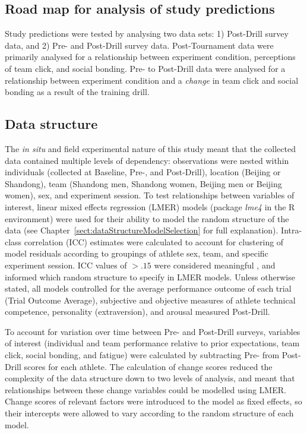 \begin{CJK}{UTF8}{gbsn}
\subsection{Road map for analysis of study predictions}

Study predictions were tested by analysing two data sets: 1) Post-Drill survey data, and 2) Pre- and Post-Drill survey data.  Post-Tournament data were primarily analysed for a relationship between experiment condition, perceptions of team click, and social bonding.  Pre- to Post-Drill data were analysed for a relationship between experiment condition and a \textit{change} in team click and social bonding as a result of the training drill.





\subsection{Data structure}
The \textit{in situ} and field experimental nature of this study meant that the collected data contained multiple levels of dependency: observations were nested within individuals (collected at Baseline, Pre-, and Post-Drill), location (Beijing or Shandong), team (Shandong men, Shandong women, Beijing men or Beijing women), sex, and experiment session.   To test relationships between variables of interest, linear mixed effects regression (LMER) models (package \textit{lme4} in the R environment) were used for their ability to model the random structure of the data (see Chapter~\ref{sect:dataStructureModelSelection} for full explanation).  Intra-class correlation (ICC) estimates were calculated to account for clustering of model residuals according to groupings of athlete sex, team, and specific experiment session.  ICC values of $>.15$ were considered meaningful \citep{Field2012}, and informed which random structure to specify in LMER models.  Unless otherwise stated, all models controlled for the average performance outcome of each trial (Trial Outcome Average), subjective and objective measures of athlete technical competence, personality (extraversion), and arousal measured Post-Drill.

To account for variation over time between Pre- and Post-Drill surveys, variables of interest (individual and team performance relative to prior expectations, team click, social bonding, and fatigue) were calculated by subtracting Pre- from Post-Drill scores for each athlete. The calculation of change scores reduced the complexity of the data structure down to two levels of analysis, and meant that relationships between these change variables could be modelled using LMER. Change scores of relevant factors were introduced to the model as fixed effects, so their intercepts were allowed to vary according to the random structure of each model.


\end{CJK}
